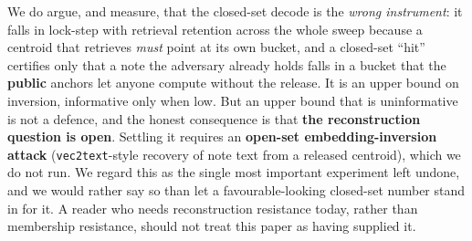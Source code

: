\documentclass[pdflatex,sn-mathphys-num,iicol]{sn-jnl}
\theoremstyle{thmstyleone}%
\theoremstyle{thmstyletwo}%
\theoremstyle{thmstylethree}%
\begin{document}
We do argue, and measure, that the closed-set decode is the \emph{wrong instrument}: it
falls in lock-step with retrieval retention across the whole sweep because a centroid that
retrieves \emph{must} point at its own bucket, and a closed-set ``hit'' certifies only that a
note the adversary already holds falls in a bucket that the \textbf{public} anchors let anyone
compute without the release. It is an upper bound on inversion, informative only when low. But
an upper bound that is uninformative is not a defence, and the honest consequence is that
\textbf{the reconstruction question is open}. Settling it requires an \textbf{open-set
embedding-inversion attack} (\texttt{vec2text}-style recovery of note text from a released
centroid), which we do not run. We regard this as the single most important experiment left
undone, and we would rather say so than let a favourable-looking closed-set number stand in for
it. A reader who needs reconstruction resistance today, rather than membership resistance,
should not treat this paper as having supplied it.
\end{document}
